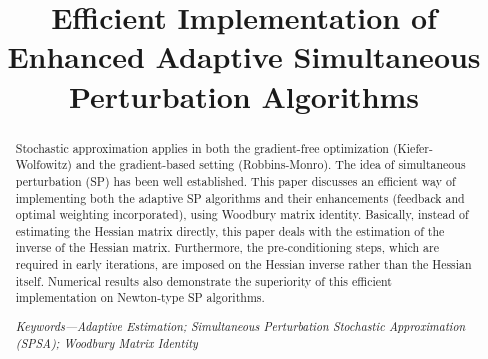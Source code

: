 \documentclass[conference]{IEEEtran}
\begin{document}
\title{Efficient Implementation of Enhanced Adaptive Simultaneous Perturbation Algorithms}
\author{
\and
{}
\and
{}
}

\maketitle

\begin{abstract}
Stochastic approximation applies in both the gradient-free optimization (Kiefer-Wolfowitz) and the gradient-based setting (Robbins-Monro). The idea of simultaneous perturbation (SP) has been well established. This paper discusses an efficient way of implementing both the adaptive SP algorithms and their enhancements (feedback and optimal weighting incorporated), using Woodbury matrix identity. Basically, instead of estimating the Hessian matrix directly, this paper deals with the estimation of the inverse of the Hessian matrix. Furthermore, the pre-conditioning steps, which are required in early iterations, are imposed on the Hessian inverse rather than the Hessian itself. Numerical results also demonstrate the superiority of this efficient implementation on Newton-type SP algorithms.

\textit{Keywords---Adaptive Estimation; Simultaneous Perturbation Stochastic Approximation (SPSA); Woodbury Matrix Identity}
\end{abstract}

\IEEEpeerreviewmaketitle
\end{document}
